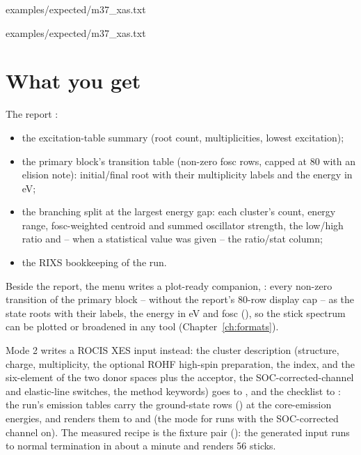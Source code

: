 
  {examples/expected/m37_xas.txt}


  {examples/expected/m37_xas.txt}

\section{What you get}

The report :

\begin{itemize}
  \item the excitation-table summary (root count, multiplicities, lowest
    excitation);
  \item the primary block's transition table (non-zero fosc rows, capped at
    80 with an elision note): initial/final root with their multiplicity
    labels and the energy in eV;
  \item the branching split at the largest energy gap: each cluster's
    count, energy range, fosc-weighted centroid and summed oscillator
    strength, the low/high ratio and -- when a statistical value was given
    -- the ratio/stat column;
  \item the RIXS bookkeeping of the run.
\end{itemize}

Beside the report, the menu writes a plot-ready companion,
: every non-zero transition of the primary block
-- without the report's 80-row display cap -- as the state roots with their
labels, the energy in eV and fosc
(), so the stick
spectrum can be plotted or broadened in any tool
(Chapter~\ref{ch:formats}).

Mode 2 writes a ROCIS XES input instead: the cluster description (structure,
charge, multiplicity, the optional ROHF high-spin preparation, the
 index,  and the six-element  of
the two donor spaces plus the acceptor, the SOC-corrected-channel and
elastic-line switches, the method keywords) goes to ,
and the checklist to : the run's emission
tables carry the ground-state rows () at
the core-emission energies, and
renders them to  and  (the
 mode for runs with the SOC-corrected channel on).  The
measured recipe is the  fixture pair
(): the generated input runs to normal termination in
about a minute and renders 56 sticks.


